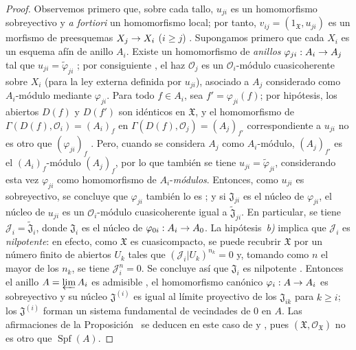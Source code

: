 \documentclass[oneside]{amsart}
\theoremstyle{ega-env-style}
\theoremstyle{ega-thm-env-style}
\theoremstyle{ega-defn-env-style}
\def\geq{\geqslant}                 %
\renewcommand{\to}{\mathchoice{\longrightarrow}{\rightarrow}{\rightarrow}{\rightarrow}}
\begin{document}
\begin{proof}
Observemos primero que, sobre cada tallo, $u_{ji}$ es un homomorfismo sobreyectivo y \emph{a fortiori} un homomorfismo local; por tanto, $v_{ij}=(1_{\mathfrak{X}},u_{ji})$ es un morfismo de preesquemas $X_j\to X_i$ ($i\geq j$) .
Supongamos primero que cada $X_i$ es un esquema afín de anillo $A_i$.
Existe un homomorfismo de \emph{anillos} $\varphi_{ji}:A_i\to A_j$ tal que $u_{ji}=\widetilde{\varphi}_{ji}$ ; por consiguiente , el haz $\mathscr{O}_j$ es un $\mathscr{O}_i$-módulo cuasicoherente sobre $X_i$ (para la ley externa definida por $u_{ji}$), asociado a $A_j$ considerado como $A_i$-módulo mediante $\varphi_{ji}$.
Para todo $f\in A_i$, sea $f'=\varphi_{ji}(f)$; por hipótesis, los abiertos $D(f)$ y $D(f')$ son idénticos en $\mathfrak{X}$, y el homomorfismo de $\Gamma(D(f),\mathscr{O}_i)=(A_i)_f$ en $\Gamma(D(f),\mathscr{O}_j)=(A_j)_{f'}$ correspondiente a $u_{ji}$ no es otro que $(\varphi_{ji})_f$ .
Pero, cuando se considera $A_j$ como $A_i$-módulo, $(A_j)_{f'}$ es el $(A_i)_f$-módulo $(A_j)_f$, por lo que también se tiene $u_{ji}=\widetilde{\varphi}_{ji}$, considerando esta vez $\varphi_{ji}$ como homomorfismo de $A_i$-\emph{módulos}.
Entonces, como $u_{ji}$ es sobreyectivo, se concluye que $\varphi_{ji}$ también lo es ; y si $\mathfrak{J}_{ji}$ es el núcleo de $\varphi_{ji}$, el núcleo de $u_{ji}$ es un $\mathscr{O}_i$-módulo cuasicoherente igual a $\widetilde{\mathfrak{J}}_{ji}$.
En particular, se tiene $\mathscr{J}_i=\widetilde{\mathfrak{J}}_i$, donde $\mathfrak{J}_i$ es el núcleo de $\varphi_{0i}:A_i\to A_0$.
La hipótesis~\emph{b)} implica que $\mathscr{J}_i$ es \emph{nilpotente}: en efecto, como $\mathfrak{X}$ es cuasicompacto, se puede recubrir $\mathfrak{X}$ por un número finito de abiertos $U_k$ tales que $(\mathscr{J}_i|U_k)^{n_k}=0$ y, tomando como $n$ el mayor de los $n_k$, se tiene $\mathscr{J}_i^n=0$.
Se concluye así que $\mathfrak{J}_i$ es nilpotente .
Entonces el anillo $A=\varprojlim A_i$ es admisible , el homomorfismo canónico $\varphi_i:A\to A_i$ es sobreyectivo y su núcleo $\mathfrak{J}^{(i)}$ es igual al límite proyectivo de los $\mathfrak{J}_{ik}$ para $k\geq i$; los $\mathfrak{J}^{(i)}$ forman un sistema fundamental de vecindades de 0 en $A$.
Las afirmaciones de la Proposición~ se deducen en este caso de  y , pues $(\mathfrak{X},\mathscr{O}_{\mathfrak{X}})$ no es otro que $\operatorname{Spf}(A)$.


\end{proof}
\end{document}
